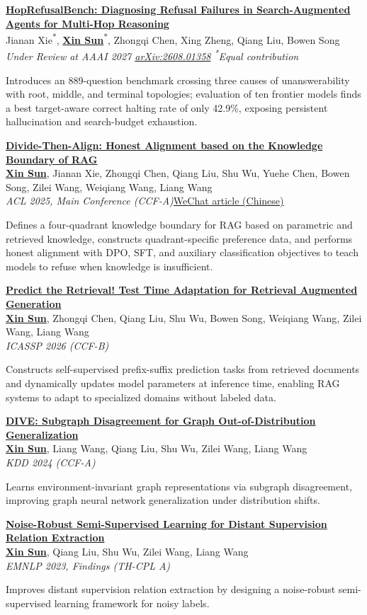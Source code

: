 \documentclass[letterpaper,11pt]{article}
\newcommand{\pubentry}[6]{
  \Needspace{6\baselineskip}
  \item \textbf{\href{#1}{#2}} \\
  {\small #3} \\
  {\small \textit{#4}\hfill #5}
  {#6\par}
  \vspace{0pt}
}
\begin{document}
\begin{enumerate}[leftmargin=0.3in, label={[\arabic*]}]
  \pubentry{https://arxiv.org/abs/2608.01358}{HopRefusalBench: Diagnosing Refusal Failures in Search-Augmented Agents for Multi-Hop Reasoning}
  {Jianan Xie\textsuperscript{*}, \textbf{\underline{Xin Sun}}\textsuperscript{*}, Zhongqi Chen, Xing Zheng, Qiang Liu, Bowen Song}
  {Under Review at AAAI 2027 \quad \href{https://arxiv.org/abs/2608.01358}{arXiv:2608.01358} \quad \textsuperscript{*}Equal contribution}{}
  {\small\color{secondary} Introduces an 889-question benchmark crossing three causes of unanswerability with root, middle, and terminal topologies; evaluation of ten frontier models finds a best target-aware correct halting rate of only 42.9\%, exposing persistent hallucination and search-budget exhaustion.}

  \pubentry{https://aclanthology.org/2025.acl-long.561/}{Divide-Then-Align: Honest Alignment based on the Knowledge Boundary of RAG}
  {\textbf{\underline{Xin Sun}}, Jianan Xie, Zhongqi Chen, Qiang Liu, Shu Wu, Yuehe Chen, Bowen Song, Zilei Wang, Weiqiang Wang, Liang Wang}
  {ACL 2025, Main Conference (CCF-A)}{\href{https://mp.weixin.qq.com/s/bBKgZvC7Gnj-v3RNBCzBXw}{WeChat article (Chinese)}\quad}
  {\small\color{secondary} Defines a four-quadrant knowledge boundary for RAG based on parametric and retrieved knowledge, constructs quadrant-specific preference data, and performs honest alignment with DPO, SFT, and auxiliary classification objectives to teach models to refuse when knowledge is insufficient.}

  \pubentry{https://arxiv.org/abs/2601.11443}{Predict the Retrieval! Test Time Adaptation for Retrieval Augmented Generation}
  {\textbf{\underline{Xin Sun}}, Zhongqi Chen, Qiang Liu, Shu Wu, Bowen Song, Weiqiang Wang, Zilei Wang, Liang Wang}
  {ICASSP 2026 (CCF-B)}{}
  {\small\color{secondary} Constructs self-supervised prefix-suffix prediction tasks from retrieved documents and dynamically updates model parameters at inference time, enabling RAG systems to adapt to specialized domains without labeled data.}

  \pubentry{https://arxiv.org/abs/2408.04400}{DIVE: Subgraph Disagreement for Graph Out-of-Distribution Generalization}
  {\textbf{\underline{Xin Sun}}, Liang Wang, Qiang Liu, Shu Wu, Zilei Wang, Liang Wang}
  {KDD 2024 (CCF-A)}{}
  {\small\color{secondary} Learns environment-invariant graph representations via subgraph disagreement, improving graph neural network generalization under distribution shifts.}

  \pubentry{https://aclanthology.org/2023.findings-emnlp.876/}{Noise-Robust Semi-Supervised Learning for Distant Supervision Relation Extraction}
  {\textbf{\underline{Xin Sun}}, Qiang Liu, Shu Wu, Zilei Wang, Liang Wang}
  {EMNLP 2023, Findings (TH-CPL A)}{}
  {\small\color{secondary} Improves distant supervision relation extraction by designing a noise-robust semi-supervised learning framework for noisy labels.}


\end{enumerate}
\end{document}
